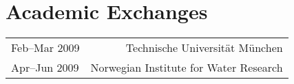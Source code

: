 \section*{Academic Exchanges}
\begin{tabular}{L!{\VRule}R}  
Feb--Mar 2009 & Technische Universität München \\
Apr--Jun 2009 & Norwegian Institute for Water Research \\
\end{tabular}
